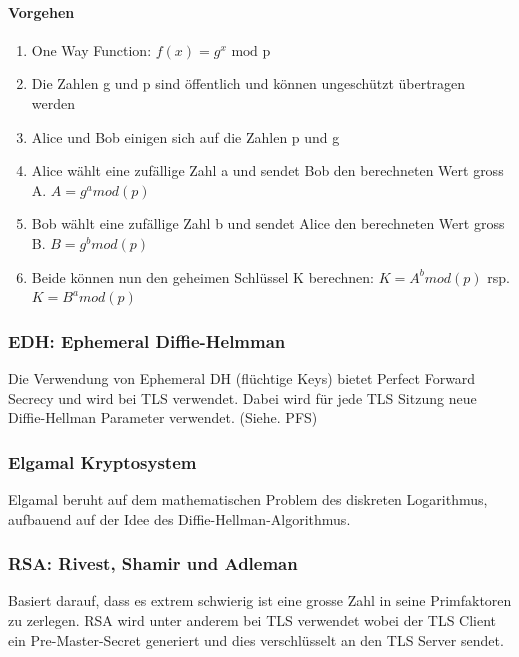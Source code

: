\paragraph{Vorgehen}
\begin{enumerate}
	\item One Way Function: $f(x) = g^x \text{ mod p}$
	\item Die Zahlen g und p sind öffentlich und können ungeschützt übertragen werden
	\item Alice und Bob einigen sich auf die Zahlen p und g
	\item Alice wählt eine zufällige Zahl a und sendet Bob den berechneten Wert gross A. $ A = g^a { mod(p)}$
	\item Bob wählt eine zufällige Zahl b und sendet Alice den berechneten Wert gross B. $ B = g^{b}{ mod(p)} $
	\item Beide können nun den geheimen Schlüssel K berechnen: $K= A^{b}{ mod(p)} $ rsp. $K= B^{a}{ mod(p)} $
\end{enumerate}

\subsubsection{EDH: Ephemeral Diffie-Helmman}
Die Verwendung von Ephemeral DH (flüchtige Keys) bietet Perfect Forward Secrecy und wird bei TLS verwendet. Dabei wird für jede TLS Sitzung neue Diffie-Hellman Parameter verwendet. (Siehe. PFS)

\subsubsection{Elgamal Kryptosystem}
Elgamal beruht auf dem mathematischen Problem des diskreten
Logarithmus, aufbauend auf der Idee des Diffie-Hellman-Algorithmus.

\subsubsection{RSA: Rivest, Shamir und Adleman}
Basiert darauf, dass es extrem schwierig ist eine grosse Zahl in seine Primfaktoren zu zerlegen. RSA wird unter anderem bei TLS verwendet wobei der TLS Client ein Pre-Master-Secret generiert und dies verschlüsselt an den TLS Server sendet.

